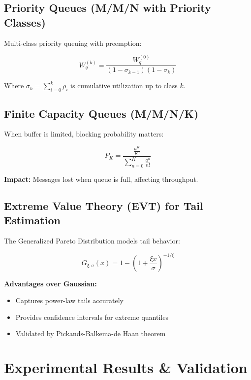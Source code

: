 \documentclass[11pt,a4paper]{article}
\begin{document}
\subsection{Priority Queues (M/M/N with Priority Classes)}

Multi-class priority queuing with preemption:

\begin{equation}
W_q^{(k)} = \frac{W_q^{(0)}}{(1 - \sigma_{k-1})(1 - \sigma_k)}
\end{equation}

Where $\sigma_k = \sum_{i=0}^{k} \rho_i$ is cumulative utilization up to class $k$.

\subsection{Finite Capacity Queues (M/M/N/K)}

When buffer is limited, blocking probability matters:

\begin{equation}
P_K = \frac{\frac{a^K}{K!}}{\sum_{n=0}^{K}\frac{a^n}{n!}}
\end{equation}

\textbf{Impact:} Messages lost when queue is full, affecting throughput.

\subsection{Extreme Value Theory (EVT) for Tail Estimation}

The Generalized Pareto Distribution models tail behavior:

\begin{equation}
G_{\xi,\sigma}(x) = 1 - \left(1 + \frac{\xi x}{\sigma}\right)^{-1/\xi}
\end{equation}

\textbf{Advantages over Gaussian:}
\begin{itemize}
    \item Captures power-law tails accurately
    \item Provides confidence intervals for extreme quantiles
    \item Validated by Pickands-Balkema-de Haan theorem
\end{itemize}


\section{Experimental Results \& Validation}
\end{document}
